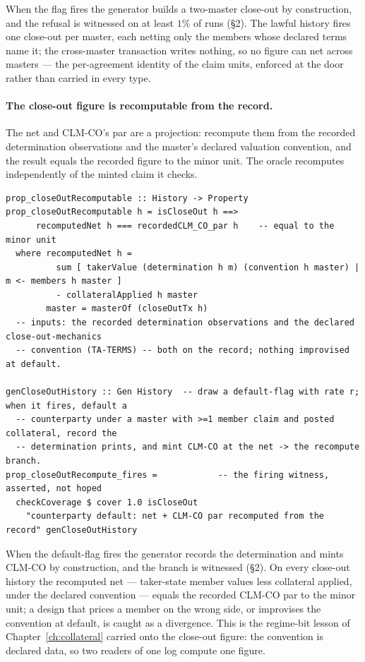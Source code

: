 \documentclass[11pt,a4paper]{article}
\begin{document}
When the flag fires the generator builds a two-master close-out by construction, and the
refusal is witnessed on at least $1\%$ of runs (\S 2). The lawful history fires one close-out
per master, each netting only the members whose declared terms name it; the cross-master
transaction writes nothing, so no figure can net across masters --- the per-agreement identity
of the claim units, enforced at the door rather than carried in every type.

\paragraph{The close-out figure is recomputable from the record.} The net and CLM-CO's par are
a projection: recompute them from the recorded determination observations and the master's
declared valuation convention, and the result equals the recorded figure to the minor unit.
The oracle recomputes independently of the minted claim it checks.

\begin{lstlisting}
prop_closeOutRecomputable :: History -> Property
prop_closeOutRecomputable h = isCloseOut h ==>
      recomputedNet h === recordedCLM_CO_par h    -- equal to the minor unit
  where recomputedNet h =
          sum [ takerValue (determination h m) (convention h master) | m <- members h master ]
          - collateralApplied h master
        master = masterOf (closeOutTx h)
  -- inputs: the recorded determination observations and the declared close-out-mechanics
  -- convention (TA-TERMS) -- both on the record; nothing improvised at default.

genCloseOutHistory :: Gen History  -- draw a default-flag with rate r; when it fires, default a
  -- counterparty under a master with >=1 member claim and posted collateral, record the
  -- determination prints, and mint CLM-CO at the net -> the recompute branch.
prop_closeOutRecompute_fires =            -- the firing witness, asserted, not hoped
  checkCoverage $ cover 1.0 isCloseOut
    "counterparty default: net + CLM-CO par recomputed from the record" genCloseOutHistory
\end{lstlisting}

When the default-flag fires the generator records the determination and mints CLM-CO by
construction, and the branch is witnessed (\S 2). On every close-out history the recomputed
net --- taker-state member values less collateral applied, under the declared convention ---
equals the recorded CLM-CO par to the minor unit; a design that prices a member on the wrong
side, or improvises the convention at default, is caught as a divergence. This is the
regime-bit lesson of Chapter~\ref{ch:collateral} carried onto the close-out figure: the
convention is declared data, so two readers of one log compute one figure.
\end{document}
